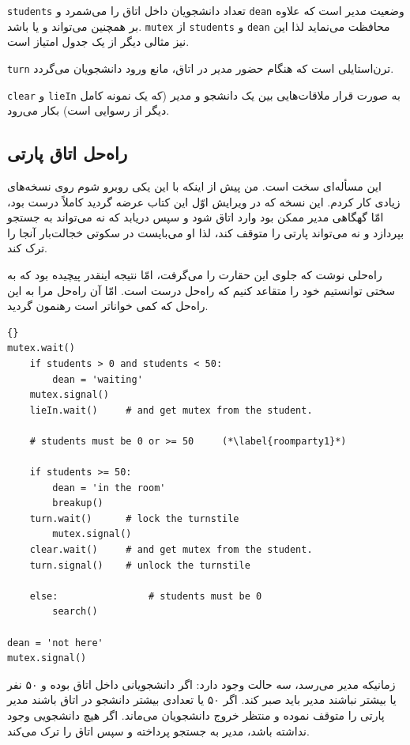 \documentclass{book}
\newcommand{\clearemptydoublepage}{\newpage\cleardoublepage}
\begin{document}
    {\tt students}
    تعداد دانشجویان داخل اتاق را می‌شمرد و {\tt dean}  وضعیت مدیر است که علاوه بر  
    همچنین می‌تواند  و یا  باشد. 
    {\tt mutex}
    از  {\tt students} و {\tt dean} محافظت می‌نماید لذا این نیز مثالی دیگر از یک جدول امتیاز است. 
    

    {\tt turn}
    ترن‌استایلی است که هنگام حضور مدیر در اتاق، مانع ورود دانشجویان می‌گردد. 

    {\tt clear} و {\tt lieIn}
    به صورت قرار ملاقات‌هایی بین  یک دانشجو و مدیر (که یک نمونه کامل دیگر از رسوایی است)  بکار می‌رود. 


\clearemptydoublepage
\subsection{راه‌حل اتاق پارتی}

    این مسأله‌ای  سخت است. من پیش از اینکه با این یکی روبرو شوم روی نسخه‌های زیادی کار کردم. این نسخه که در ویرایش اوّل این کتاب عرضه گردید 
    کاملاً درست بود، امّا گهگاهی مدیر ممکن بود وارد اتاق شود و سپس دریابد که نه می‌تواند به جستجو بپردازد و نه می‌تواند پارتی را متوقف کند، لذا او می‌بایست 
    در سکوتی خجالت‌بار آنجا را ترک کند. 

    راه‌حلی نوشت که جلوی این حقارت را می‌گرفت، امّا نتیجه اینقدر پیچیده بود که به سختی توانستیم خود را متقاعد کنیم که راه‌حل درست است. 
    امّا آن راه‌حل مرا به این راه‌حل که کمی خواناتر است رهنمون گردید. 


\begin{latin}
\begin{lstlisting}[title=\rl{راه‌حل اتاق پارتی (مدیر)}]{}
mutex.wait()
    if students > 0 and students < 50:
        dean = 'waiting'
	mutex.signal()
	lieIn.wait()     # and get mutex from the student.

    # students must be 0 or >= 50     (*\label{roomparty1}*)

    if students >= 50:
        dean = 'in the room'
        breakup()
	turn.wait()      # lock the turnstile
        mutex.signal()
	clear.wait()     # and get mutex from the student.
	turn.signal()    # unlock the turnstile

    else:                # students must be 0
        search()

dean = 'not here'
mutex.signal() 
\end{lstlisting}
\end{latin}

    زمانیکه مدیر می‌رسد، سه حالت وجود دارد: 
    اگر دانشجویانی داخل اتاق بوده و ۵۰ نفر یا بیشتر  نباشند مدیر باید صبر کند. اگر ۵۰ یا تعدادی بیشتر دانشجو در اتاق باشند مدیر پارتی را متوقف نموده و 
    منتظر خروج دانشجویان می‌ماند. اگر هیچ دانشجویی وجود نداشته باشد، مدیر به جستجو پرداخته و سپس اتاق را ترک می‌کند. 
    
\end{document}
